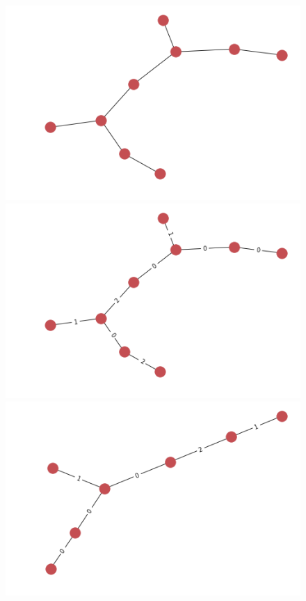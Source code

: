 \documentclass{article}
\theoremstyle{definition}
\begin{document}
\begin{figure}[!htb]
	\begin{multicols}{4}
		\includegraphics[width=\linewidth]{data/generated-graphs/tree_base.png}\par
		\includegraphics[width=\linewidth]{data/generated-graphs/tree_labels.png}\par
		\includegraphics[width=\linewidth]{data/generated-graphs/tree_altered_struct.png}\par

\end{multicols}
\end{figure}
\end{document}

